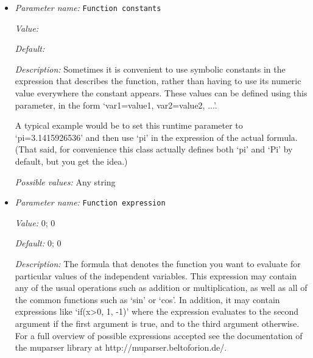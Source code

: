 \begin{itemize}
\item {\it Parameter name:} {\tt Function constants}
\label{parameters:Adiabatic conditions model/Compute profile/Surface condition function/Function constants}
\label{parameters:Adiabatic_20conditions_20model/Compute_20profile/Surface_20condition_20function/Function_20constants}


{\it Value:} 


{\it Default:} 


{\it Description:} Sometimes it is convenient to use symbolic constants in the expression that describes the function, rather than having to use its numeric value everywhere the constant appears. These values can be defined using this parameter, in the form `var1=value1, var2=value2, ...'.

A typical example would be to set this runtime parameter to `pi=3.1415926536' and then use `pi' in the expression of the actual formula. (That said, for convenience this class actually defines both `pi' and `Pi' by default, but you get the idea.)


{\it Possible values:} Any string
\item {\it Parameter name:} {\tt Function expression}
\label{parameters:Adiabatic conditions model/Compute profile/Surface condition function/Function expression}
\label{parameters:Adiabatic_20conditions_20model/Compute_20profile/Surface_20condition_20function/Function_20expression}


{\it Value:} 0; 0


{\it Default:} 0; 0


{\it Description:} The formula that denotes the function you want to evaluate for particular values of the independent variables. This expression may contain any of the usual operations such as addition or multiplication, as well as all of the common functions such as `sin' or `cos'. In addition, it may contain expressions like `if(x>0, 1, -1)' where the expression evaluates to the second argument if the first argument is true, and to the third argument otherwise. For a full overview of possible expressions accepted see the documentation of the muparser library at http://muparser.beltoforion.de/.


\end{itemize}
